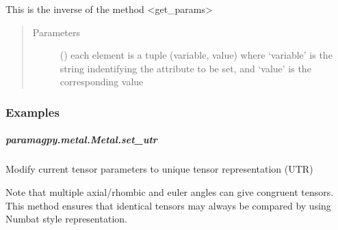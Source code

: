\documentclass[a4paper,10pt,english,openany,oneside]{sphinxmanual}
\begin{document}
\begin{fulllineitems}
\begin{fulllineitems}
\begin{fulllineitems}
This is the inverse of the method \textless{}get\_params\textgreater{}
\begin{quote}\begin{description}
\item[{Parameters}] \leavevmode
{} () \textendash{} each element is a tuple (variable, value) where ‘variable’
is the string indentifying the attribute to be set, and ‘value’
is the corresponding value

\end{description}\end{quote}
\subsubsection*{Examples}

%
\begin{sphinxVerbatim}[commandchars=\\\{\}]
  
\PYG{p}{[}\PYG{p}{]}
\end{sphinxVerbatim}

\end{fulllineitems}



\subparagraph{paramagpy.metal.Metal.set\_utr}
\label{\detokenize{reference/generated/paramagpy.metal.Metal.set_utr:paramagpy-metal-metal-set-utr}}\label{\detokenize{reference/generated/paramagpy.metal.Metal.set_utr::doc}}

\begin{fulllineitems}
\label{\detokenize{reference/generated/paramagpy.metal.Metal.set_utr:paramagpy.metal.Metal.set_utr}}
Modify current tensor parameters to unique tensor representation (UTR)

Note that multiple axial/rhombic and euler angles can give congruent
tensors.
This method ensures that identical tensors may always be compared
by using Numbat style representation.


\end{fulllineitems}
\end{fulllineitems}
\end{fulllineitems}
\end{document}
